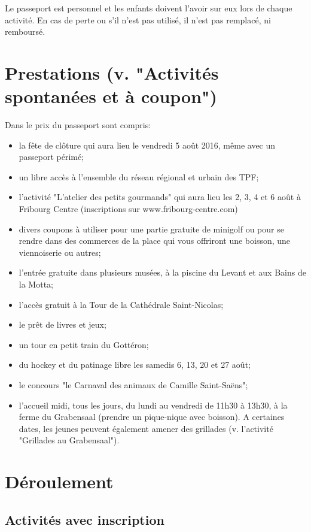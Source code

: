 Le passeport est personnel et les enfants doivent l'avoir sur eux lors de chaque activité. En cas de perte ou s'il n'est pas utilisé, il n'est pas remplacé, ni remboursé. 

\section*{Prestations (v. "Activités spontanées et à coupon")}

Dans le prix du passeport sont compris:

\begin{itemize}
\item la fête de clôture qui aura lieu le vendredi 5 août 2016, même avec un passeport périmé;
\item un libre accès à l'ensemble du réseau régional et urbain des TPF;
\item l'activité "L'atelier des petits gourmands" qui aura lieu les 2, 3, 4 et 6 août à Fribourg Centre (inscriptions sur www.fribourg-centre.com)
\item divers coupons à utiliser pour une partie gratuite de minigolf ou pour se rendre dans des commerces de la place qui vous offriront une boisson, une viennoiserie ou autres;
\item l'entrée gratuite dans plusieurs musées, à la piscine du Levant et aux Bains de la Motta;
\item l'accès gratuit à la Tour de la Cathédrale Saint-Nicolas; 
\item le prêt de livres et jeux;
\item un tour en petit train du Gottéron;
\item du hockey et du patinage libre les samedis 6, 13, 20 et 27 août;
\item le concours "le Carnaval des animaux de Camille Saint-Saëns";
\item l'accueil midi, tous les jours, du lundi au vendredi de 11h30 à 13h30, à la ferme du Grabensaal (prendre un pique-nique avec boisson). A certaines dates, les jeunes peuvent également amener des grillades (v. l'activité "Grillades au Grabensaal").
\end{itemize}

\section*{Déroulement}

\subsection*{Activités avec inscription}

